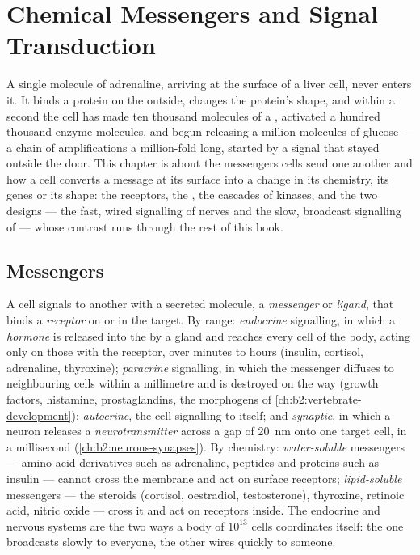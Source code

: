 \chapter{Chemical Messengers and Signal Transduction}\label{ch:b2:cell-signalling}

A single molecule of adrenaline, arriving at the surface of a liver
cell, never enters it. It binds a protein on the outside, changes
the protein's shape, and within a second the cell has made ten
thousand molecules of a , activated a hundred
thousand enzyme molecules, and begun releasing a million molecules
of glucose --- a chain of amplifications a million-fold long, started
by a signal that stayed outside the door. This chapter is about the
messengers cells send one another and how a cell converts a
message at its surface into a change in its chemistry, its genes or
its shape: the receptors, the , the cascades of
kinases, and the two designs --- the fast, wired signalling of nerves
and the slow, broadcast signalling of  --- whose contrast
runs through the rest of this book.

\section{Messengers}

\begin{definition}\label{def:b2:cell-signalling:kinds}
A cell signals to another with a secreted molecule, a
\emph{messenger} or \emph{ligand}, that binds a \emph{receptor} on or
in the target. By range: \emph{endocrine} signalling, in which a
\emph{hormone} is released into the  by a gland and reaches
every cell of the body, acting only on those with the receptor,
over minutes to hours (insulin, cortisol, adrenaline, thyroxine);
\emph{paracrine} signalling, in which the messenger diffuses to
neighbouring cells within a millimetre and is destroyed on the way
(growth factors, histamine, prostaglandins, the morphogens of
\cref{ch:b2:vertebrate-development}); \emph{autocrine}, the cell
signalling to itself; and \emph{synaptic}, in which a neuron
releases a \emph{neurotransmitter} across a gap of \qty{20}{nm} onto
one target cell, in a millisecond (\cref{ch:b2:neurons-synapses}).
By chemistry: \emph{water-soluble} messengers --- amino-acid
derivatives such as adrenaline, peptides and proteins such as
insulin --- cannot cross the membrane and act on surface receptors;
\emph{lipid-soluble} messengers --- the steroids (cortisol,
oestradiol, testosterone), thyroxine, retinoic acid, nitric oxide ---
cross it and act on receptors inside. The endocrine and nervous
systems are the two ways a body of $10^{13}$ cells coordinates
itself: the one broadcasts slowly to everyone, the other wires
quickly to someone.
\end{definition}

